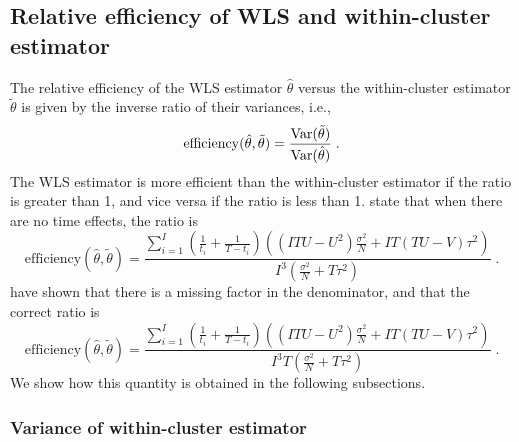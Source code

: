 \documentclass[10pt]{article}
\begin{document}
\subsection{Relative efficiency of WLS and within-cluster estimator} \label{apx:efficiency}

The relative efficiency of the WLS estimator $\hat{\theta}$ versus the within-cluster estimator $\tilde{\theta}$ is given by the inverse ratio of their variances, i.e.,
\[
\mathrm{efficiency}(\hat{\theta},\tilde{\theta}) = \frac{\mathrm{Var}(\tilde{\theta})}{\mathrm{Var}(\hat{\theta})} \;.
\]
The WLS estimator is more efficient than the within-cluster estimator if the ratio is greater than 1, and vice versa if the ratio is less than 1. \textcite{Hussey:2007} state that when there are no time effects, the ratio is
\[
\mathrm{efficiency}(\hat{\theta},\tilde{\theta}) = \frac{\sum_{i=1}^I\left(\frac{1}{t_i}+\frac{1}{T-t_i}\right)\left((ITU-U^2)\frac{\sigma^2}{N}+IT(TU-V)\tau^2\right)}{I^3\left(\frac{\sigma^2}{N}+T\tau^2\right)} \;.
\]
\textcite{Liao:2015} have shown that there is a missing factor in the denominator, and that the correct ratio is
\[
\mathrm{efficiency}(\hat{\theta},\tilde{\theta}) = \frac{\sum_{i=1}^I\left(\frac{1}{t_i}+\frac{1}{T-t_i}\right)\left((ITU-U^2)\frac{\sigma^2}{N}+IT(TU-V)\tau^2\right)}{I^3T\left(\frac{\sigma^2}{N}+T\tau^2\right)} \;.
\]
We show how this quantity is obtained in the following subsections.

\iffalse
Note: $\Var(\hat{\theta})$ is not the one given above as it is assumed there are no time effects.
\begin{align*}
\mathrm{efficacy}(\hat{\theta},\tilde{\theta}) &= \frac{\Var(\tilde{\theta})}{\Var(\hat{\theta})} \\
&= \frac{\left(\frac{\sigma^2}{NI^2}\sum_i\left(\frac{1}{t_i}+\frac{1}{T-t_i}\right)\right)}{\left(\frac{I\sigma^2\left(\frac{\sigma^2}{N}+T\tau^2\right)}{(IU-W)\sigma^2+N(U^2+ITU-TW-IV)\tau^2}\right)} \\
&= \frac{\sum_i\left(\frac{1}{t_i}+\frac{1}{T-t_i}\right)\left((IU-W)\sigma^2+N(U^2+ITU-TW-IV)\tau^2\right)}{NI^3\left(\frac{\sigma^2}{N}+T\tau^2\right)} \\
&= \frac{\sum_i\left(\frac{1}{t_i}+\frac{1}{T-t_i}\right)\left((IU-W)\frac{\sigma^2}{N}+(U^2+ITU-TW-IV)\tau^2\right)}{I^3\left(\frac{\sigma^2}{N}+T\tau^2\right)} 
\end{align*}
\fi

\subsubsection{Variance of within-cluster estimator} \label{apx:withincluster}
\end{document}

